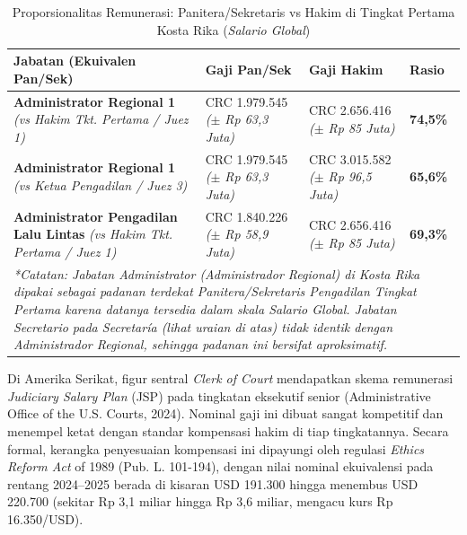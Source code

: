\documentclass[12pt, a4paper]{article}
\begin{document}
\begin{table}[H]
\centering
\fontsize{10}{12}\selectfont
\caption{Proporsionalitas Remunerasi: Panitera/Sekretaris vs Hakim di Tingkat Pertama Kosta Rika (\textit{Salario Global})}
\label{tab:komparasi-kostarika}
\renewcommand{\arraystretch}{1.4}
\begin{tabular}{p{5.5cm} p{3.0cm} p{3.5cm} p{2.0cm}}
\hline
\textbf{Jabatan (Ekuivalen Pan/Sek)} & \textbf{Gaji Pan/Sek} & \textbf{Gaji Hakim} & \textbf{Rasio} \tabularnewline
\hline
\raggedright\textbf{Administrator Regional 1} \newline \textit{(vs Hakim Tkt. Pertama / Juez 1)} & \raggedright CRC 1.979.545 \newline \textit{($\pm$ Rp 63,3 Juta)} & \raggedright CRC 2.656.416 \newline \textit{($\pm$ Rp 85 Juta)} & \textbf{74,5\%} \tabularnewline
\raggedright\textbf{Administrator Regional 1} \newline \textit{(vs Ketua Pengadilan / Juez 3)} & \raggedright CRC 1.979.545 \newline \textit{($\pm$ Rp 63,3 Juta)} & \raggedright CRC 3.015.582 \newline \textit{($\pm$ Rp 96,5 Juta)} & \textbf{65,6\%} \tabularnewline
\raggedright\textbf{Administrator Pengadilan Lalu Lintas} \newline \textit{(vs Hakim Tkt. Pertama / Juez 1)} & \raggedright CRC 1.840.226 \newline \textit{($\pm$ Rp 58,9 Juta)} & \raggedright CRC 2.656.416 \newline \textit{($\pm$ Rp 85 Juta)} & \textbf{69,3\%} \tabularnewline
\hline
\multicolumn{4}{p{14cm}}{\textit{*Catatan: Jabatan Administrator (\textit{Administrador Regional}) di Kosta Rika dipakai sebagai padanan terdekat Panitera/Sekretaris Pengadilan Tingkat Pertama karena datanya tersedia dalam skala \textit{Salario Global}. Jabatan \textit{Secretario} pada \textit{Secretaría} (lihat uraian di atas) tidak identik dengan \textit{Administrador Regional}, sehingga padanan ini bersifat aproksimatif.}} \tabularnewline
\end{tabular}
\end{table}

Di Amerika Serikat, figur sentral \textit{Clerk of Court} mendapatkan skema remunerasi \textit{Judiciary Salary Plan} (JSP) pada tingkatan eksekutif senior (Administrative Office of the U.S. Courts, 2024). Nominal gaji ini dibuat sangat kompetitif dan menempel ketat dengan standar kompensasi hakim di tiap tingkatannya. Secara formal, kerangka penyesuaian kompensasi ini dipayungi oleh regulasi \textit{Ethics Reform Act} of 1989 (Pub. L. 101-194), dengan nilai nominal ekuivalensi pada rentang 2024--2025 berada di kisaran USD 191.300 hingga menembus USD 220.700 (sekitar Rp 3,1 miliar hingga Rp 3,6 miliar, mengacu kurs Rp 16.350/USD). 
\end{document}
